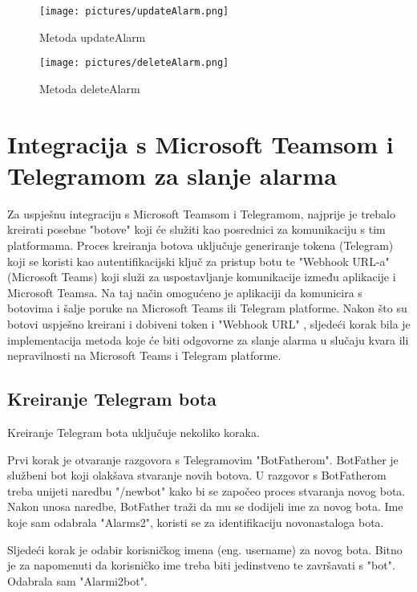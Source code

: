 \documentclass[times, utf8, zavrsni]{fer}
\begin{document}
\begin{figure}[h!]
			\texttt{[image: pictures/updateAlarm.png]} %
		\centering
			\caption{Metoda updateAlarm}
			\label{fig:promjene}
\end{figure}

\begin{figure}[h!]
			\texttt{[image: pictures/deleteAlarm.png]} %
		\centering
			\caption{Metoda deleteAlarm}
			\label{fig:promjene}
\end{figure}
\newpage
\section{ Integracija s Microsoft Teamsom i Telegramom za slanje alarma}
Za uspješnu integraciju s Microsoft Teamsom i Telegramom, najprije je trebalo kreirati posebne "botove" koji će služiti kao posrednici za komunikaciju s tim platformama. Proces kreiranja botova uključuje generiranje tokena (Telegram) koji se koristi kao autentifikacijski ključ za pristup botu te "Webhook URL-a" (Microsoft Teams) koji služi za uspostavljanje komunikacije između aplikacije i Microsoft Teamsa. Na taj način omogućeno je aplikaciji da komunicira s botovima i šalje poruke na Microsoft Teams ili Telegram platforme. Nakon što su botovi uspješno kreirani i dobiveni token i "Webhook URL" , sljedeći korak bila je implementacija metoda koje će biti odgovorne za slanje alarma u slučaju kvara ili nepravilnosti na Microsoft Teams i Telegram platforme. 
\subsection{Kreiranje Telegram bota}
Kreiranje Telegram bota uključuje nekoliko koraka.

Prvi korak je otvaranje razgovora s Telegramovim "BotFatherom". BotFather je službeni bot koji olakšava stvaranje novih botova. U razgovor s BotFatherom treba unijeti naredbu "/newbot" kako bi se započeo proces stvaranja novog bota.
Nakon unosa naredbe, BotFather traži da mu se dodijeli ime za novog bota. Ime koje sam odabrala "Alarms2", koristi se za identifikaciju novonastaloga bota.

Sljedeći korak je odabir korisničkog imena (eng. username) za novog bota. Bitno je za napomenuti da korisničko ime treba biti jedinstveno te završavati s "bot". Odabrala sam "Alarmi2bot".
\end{document}
